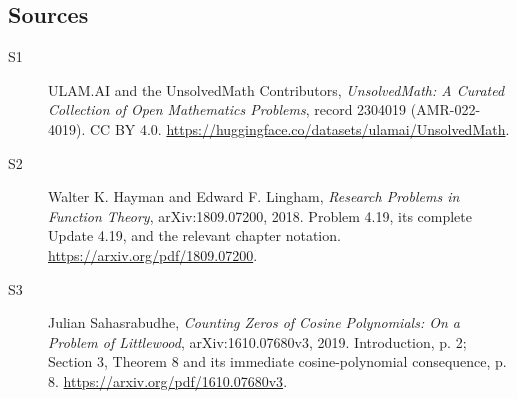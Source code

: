 \documentclass[11pt]{book}
\begin{document}
\subsection{Sources}
\begin{description}
\item[\hypertarget{source:2304019:1}{S1}] ULAM.AI and the UnsolvedMath Contributors, \emph{UnsolvedMath: A Curated Collection of Open Mathematics Problems}, record 2304019 (AMR-022-4019). CC BY 4.0. \url{https://huggingface.co/datasets/ulamai/UnsolvedMath}.
\item[\hypertarget{source:2304019:2}{S2}] Walter K. Hayman and Edward F. Lingham, \emph{Research Problems in Function Theory}, arXiv:1809.07200, 2018. Problem 4.19, its complete Update 4.19, and the relevant chapter notation. \url{https://arxiv.org/pdf/1809.07200}.
\item[\hypertarget{source:2304019:3}{S3}] Julian Sahasrabudhe, \emph{Counting Zeros of Cosine Polynomials: On a Problem of Littlewood}, arXiv:1610.07680v3, 2019. Introduction, p. 2; Section 3, Theorem 8 and its immediate cosine-polynomial consequence, p. 8. \url{https://arxiv.org/pdf/1610.07680v3}.
\end{description}
\label{end:2304019}
\end{document}
